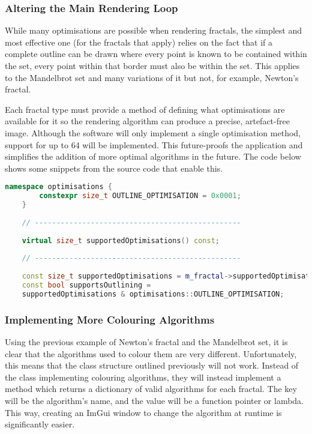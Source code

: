 \subsubsection{Altering the Main Rendering Loop}

While many optimisations are possible when rendering fractals, the simplest and most effective one (for the fractals that apply) relies on the fact that if a complete outline can be drawn where every point is known to be contained within the set, every point within that border must also be within the set. This applies to the Mandelbrot set and many variations of it but not, for example, Newton's fractal.

Each fractal type must provide a method of defining what optimisations are available for it so the rendering algorithm can produce a precise, artefact-free image. Although the software will only implement a single optimisation method, support for up to 64 will be implemented. This future-proofs the application and simplifies the addition of more optimal algorithms in the future. The code below shows some snippets from the source code that enable this.

\begin{lstlisting}[language=c++]
	namespace optimisations {
		constexpr size_t OUTLINE_OPTIMISATION = 0x0001;
	}
	
	// ------------------------------------------------
	
	virtual size_t supportedOptimisations() const;
	
	// ------------------------------------------------
	
	const size_t supportedOptimisations = m_fractal->supportedOptimisations();
	const bool supportsOutlining =
	supportedOptimisations & optimisations::OUTLINE_OPTIMISATION;
\end{lstlisting}

\subsubsection{Implementing More Colouring Algorithms}

Using the previous example of Newton's fractal and the Mandelbrot set, it is clear that the algorithms used to colour them are very different. Unfortunately, this means that the class structure outlined previously will not work. Instead of the  class implementing colouring algorithms, they will instead implement a method which returns a dictionary of valid algorithms for each fractal. The key will be the algorithm's name, and the value will be a function pointer or lambda. This way, creating an ImGui window to change the algorithm at runtime is significantly easier.

